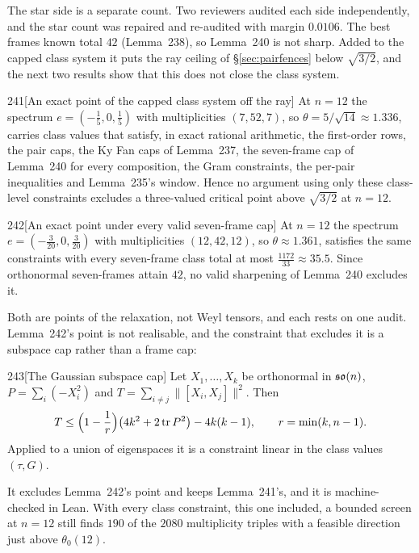 The star side is a separate count. Two reviewers audited each side independently, and the star count was repaired and re-audited with margin $0.0106$. The best frames known total $42$ (Lemma~238), so Lemma~240 is not sharp. Added to the capped class system it puts the ray ceiling of \S\ref{sec:pairfences} below $\sqrt{3/2}$, and the next two results show that this does not close the class system.

\begin{Lem}{241}[An exact point of the capped class system off the ray]
At $n=12$ the spectrum $e=(-\tfrac15,0,\tfrac15)$ with multiplicities $(7,52,7)$, so $\theta=5/\sqrt{14}\approx1.336$, carries class values that satisfy, in exact rational arithmetic, the first-order rows, the pair caps, the Ky Fan caps of Lemma~237, the seven-frame cap of Lemma~240 for every composition, the Gram constraints, the per-pair inequalities and Lemma~235's window. Hence no argument using only these class-level constraints excludes a three-valued critical point above $\sqrt{3/2}$ at $n=12$.
\end{Lem}

\begin{Lem}{242}[An exact point under every valid seven-frame cap]
At $n=12$ the spectrum $e=(-\tfrac3{20},0,\tfrac3{20})$ with multiplicities $(12,42,12)$, so $\theta\approx1.361$, satisfies the same constraints with every seven-frame class total at most $\tfrac{1172}{33}\approx35.5$. Since orthonormal seven-frames attain $42$, no valid sharpening of Lemma~240 excludes it.
\end{Lem}

Both are points of the relaxation, not Weyl tensors, and each rests on one audit. Lemma~242's point is not realisable, and the constraint that excludes it is a subspace cap rather than a frame cap:

\begin{Lem}{243}[The Gaussian subspace cap]
Let $X_1,\dots,X_k$ be orthonormal in $\mathfrak{so}(n)$, $P=\sum_i(-X_i^2)$ and $T=\sum_{i\ne j}\lVert[X_i,X_j]\rVert^2$. Then
\[
T\le\Big(1-\frac1r\Big)\big(4k^2+2\operatorname{tr} P^2\big)-4k(k-1),\qquad r=\min(k,n-1).
\]
Applied to a union of eigenspaces it is a constraint linear in the class values $(\tau,G)$.
\end{Lem}

It excludes Lemma~242's point and keeps Lemma~241's, and it is machine-checked in Lean. With every class constraint, this one included, a bounded screen at $n=12$ still finds $190$ of the $2080$ multiplicity triples with a feasible direction just above $\theta_0(12)$.


